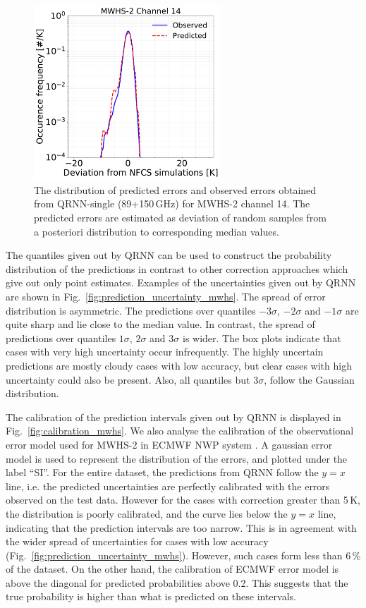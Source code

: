 \documentclass[amt, manuscript]{copernicus}
\begin{document}
\begin{figure}[t]
	\includegraphics[width=70mm]{Figures/fig07.pdf}	
	\caption{The distribution of predicted errors and observed errors  obtained from QRNN-single (89+150\,GHz) for MWHS-2 channel 14. The predicted errors are estimated as deviation of random samples from a posteriori distribution to corresponding median values.}
	\label{fig:predicted_errors_mwhs}	
\end{figure}

The quantiles given out by QRNN can be used to construct the probability distribution of the predictions in contrast to other correction approaches which give out only point estimates. Examples of the uncertainties given out by QRNN are shown in Fig.~\ref{fig:prediction_uncertainty_mwhs}. The spread of error distribution is asymmetric. The predictions over quantiles $-3\sigma$, $-2\sigma$ and $-1\sigma$ are quite sharp and lie close to the median value. In contrast, the spread of predictions over quantiles $1\sigma$, $2\sigma$ and $3\sigma$ is wider. The box plots indicate that cases with very high uncertainty occur infrequently. The highly uncertain predictions are mostly cloudy cases with low accuracy, but clear cases with high uncertainty could also be present. Also, all quantiles but  $3\sigma$, follow the Gaussian distribution.  

The calibration of the prediction intervals given out by QRNN is displayed in Fig.~\ref{fig:calibration_mwhs}. We also analyse the calibration of the observational error model used for MWHS-2 in ECMWF NWP system \citep{lawrence2018FY3C}. A gaussian error model is used to represent the distribution of the errors, and plotted under the label ``SI''. For the entire dataset, the predictions from QRNN follow the $y=x$ line, i.e. the predicted uncertainties are perfectly calibrated with the errors observed on the test data. However for the cases with correction greater than 5\,K, the distribution is poorly calibrated, and the curve lies below the $y =x$ line, indicating that the prediction intervals are too narrow. This is in agreement with the wider spread of uncertainties for cases with low accuracy (Fig.~\ref{fig:prediction_uncertainty_mwhs}). However, such cases form less than 6\,\% of the dataset. On the other hand, the calibration of ECMWF error model is above the diagonal for predicted probabilities above 0.2. This suggests that the true probability is higher than what is predicted on these intervals. 
\end{document}
